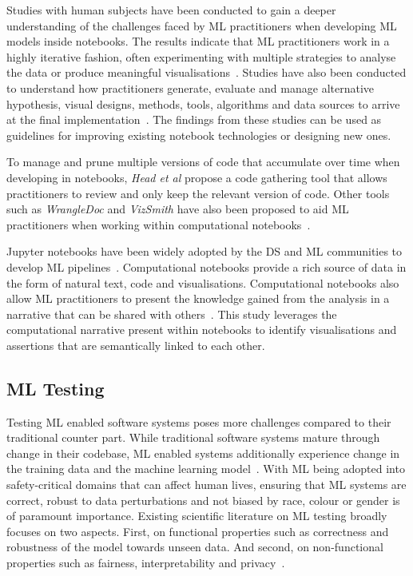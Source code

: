 Studies with human subjects have been conducted to gain a deeper understanding of the challenges faced by ML practitioners when developing ML models inside notebooks. The results indicate that ML practitioners work in a highly iterative fashion, often experimenting with multiple strategies to analyse the data or produce meaningful visualisations~\cite{kandel2012enterprise, kery2018story, liu2019understanding, chattopadhyay2020whats}. Studies have also been conducted to understand how practitioners generate, evaluate and manage alternative hypothesis, visual designs, methods, tools, algorithms and data sources to arrive at the final implementation~\cite{liu2019understanding,kandel2012enterprise}. The findings from these studies can be used as guidelines for improving existing notebook technologies or designing new ones.

To manage and prune multiple versions of code that accumulate over time when developing in notebooks, \emph{Head et al} propose a code gathering tool that allows practitioners to review and only keep the relevant version of code. Other tools such as \textit{WrangleDoc} and \textit{VizSmith} have also been proposed to aid ML practitioners when working within computational notebooks~\cite{yang2021subtle, bavishi2021vizsmith}.

Jupyter notebooks have been widely adopted by the DS and ML communities to develop ML pipelines~\cite{wang2020assessing,pimentel2019large,quaranta2021kgtorrent}. Computational notebooks provide a rich source of data in the form of natural text, code and visualisations. Computational notebooks also allow ML practitioners to present the knowledge gained from the analysis in a narrative that can be shared with others~\cite{rule2018exploration}. This study leverages the computational narrative present within notebooks to identify visualisations and assertions that are semantically linked to each other.

\subsection{ML Testing}\label{sec:ml-testing}

Testing ML enabled software systems poses more challenges compared to
their traditional counter part. While traditional software systems
mature through change in their codebase, ML enabled systems
additionally experience change in the training data and the machine
learning
model~\cite{sculley2015hidden,amershi2019software,sambasivan2021everyone}.
With ML being adopted into safety-critical domains that can affect
human lives, ensuring that ML systems are correct, robust to data
perturbations and not biased by race, colour or gender is of paramount
importance. Existing scientific literature on ML testing broadly
focuses on two aspects. First, on functional properties such as
correctness and robustness of the model towards unseen data. And
second, on non-functional properties such as fairness,
interpretability and
privacy~\cite{zhang2020machine,mehrabi2021survey,chen2022fairness}.

